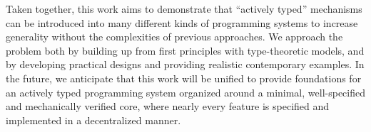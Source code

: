 Taken together, this work aims to demonstrate that ``actively typed'' mechanisms can be introduced into many different kinds of programming systems to increase generality without the complexities of previous approaches. We approach the problem both by building up from first principles with type-theoretic models, and by developing practical designs and providing realistic contemporary examples.  
In the future, we anticipate that this work will be unified to provide foundations for an actively typed programming system organized around a minimal, well-specified and mechanically verified core, where nearly every feature is specified and implemented in a decentralized manner.%

